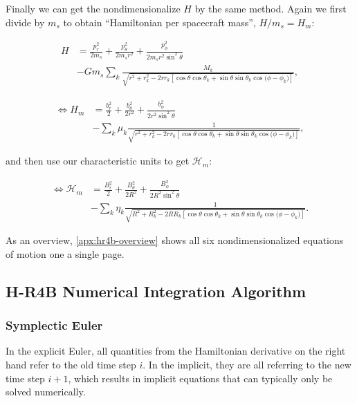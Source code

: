 Finally we can get the nondimensionalize \(H\) by the same method. Again we first divide by \(m_s\) to obtain ``Hamiltonian per spacecraft mass'', \(H/m_s = H_m\):

\begin{equation*}
    \begin{aligned}
        H &= \frac{p_r^2}{2 m_s} + \frac{p_\theta^2}{2 m_s r^2} + \frac{p_\phi^2}{2 m_s r^2 \sin^2{\theta}} \\
        &- G m_s \sum\limits_{k} \frac{M_k}{\sqrt{r^2 + r_k^2 - 2 r r_k \left[\cos{\theta}\cos{\theta_k}+\sin{\theta}\sin{\theta_k}\cos{(\phi - \phi_k})\right]}},
    \end{aligned}
\end{equation*}

\begin{equation}
    \begin{aligned}
        \Leftrightarrow H_m &= \frac{b_r^2}{2} + \frac{b_\theta^2}{2 r^2} + \frac{b_\phi^2}{2 r^2 \sin^2{\theta}} \\
        &- \sum\limits_{k} \mu_k \frac{1}{\sqrt{r^2 + r_k^2 - 2 r r_k \left[\cos{\theta}\cos{\theta_k}+\sin{\theta}\sin{\theta_k}\cos{(\phi - \phi_k})\right]}},
    \end{aligned}
\end{equation}

and then use our characteristic units to get \(\mathcal{H}_m\):

\begin{equation}
    \begin{aligned}
        \Leftrightarrow \mathcal{H}_m &= \frac{B_r^2}{2} + \frac{B_\theta^2}{2 R^2} + \frac{B_\phi^2}{2 R^2 \sin^2{\theta}} \\
        &- \sum\limits_{k} \eta_k \frac{1}{\sqrt{R^2 + R_k^2 - 2 R R_k \left[\cos{\theta}\cos{\theta_k}+\sin{\theta}\sin{\theta_k}\cos{(\phi - \phi_k})\right]}}.
    \end{aligned}
\end{equation}

As an overview, \cref{apx:hr4b-overview} shows all six nondimensionalized equations of motion one a single page.

\subsection{H-R4B Numerical Integration Algorithm}

\subsubsection{Symplectic Euler}
In the explicit Euler, all quantities from the Hamiltonian derivative on the right hand refer to the old time step \(i\). In the implicit, they are all referring to the new time step \(i+1\), which results in implicit equations that can typically only be solved numerically.

